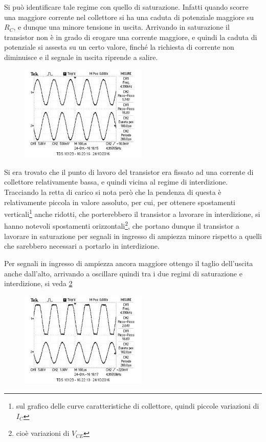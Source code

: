 \documentclass[10pt,a4paper]{article}
\begin{document}
Si può identificare tale regime con quello di saturazione. Infatti quando scorre una maggiore corrente nel collettore si ha una caduta di potenziale maggiore su $R_C$, e dunque una minore tensione in uscita. Arrivando in saturazione il transistor non è in grado di erogare una corrente maggiore, e quindi la caduta di potenziale si assesta su un certo valore, finché la richiesta di corrente non diminuisce e il segnale in uscita riprende a salire.

\begin{figure}[h!]
	\centering
	\includegraphics[width=0.54\textwidth]{../oscilloscopio/firstclipbasso.jpg}
	\caption{}
	\label{fig:clipping}
\end{figure}

Si era trovato che il punto di lavoro del transistor era fissato ad una corrente di collettore relativamente bassa, e quindi vicina al regime di interdizione. Tracciando la retta di carico si nota però che la pendenza di questa è relativamente piccola in valore assoluto, per cui, per ottenere spostamenti verticali\footnote{sul grafico delle curve caratteristiche di collettore, quindi piccole variazioni di $I_C$} anche ridotti, che porterebbero il transistor a lavorare in interdizione, si hanno notevoli spostamenti orizzontali\footnote{cioè variazioni di $V_{CE}$}, che portano dunque il transistor a lavorare in saturazione per segnali in ingresso di ampiezza minore rispetto a quelli che sarebbero necessari a portarlo in interdizione.

Per segnali in ingresso di ampiezza ancora maggiore ottengo il taglio dell'uscita anche dall'alto, arrivando a oscillare quindi tra i due regimi di saturazione e interdizione, si veda \figurename{\ref{fig:clippingdoppio}}

\begin{figure}[h!]
	\centering
	\includegraphics[width=0.54\textwidth]{../oscilloscopio/clipall.jpg}
	\caption{}
	\label{fig:clippingdoppio}
\end{figure}
\end{document}
